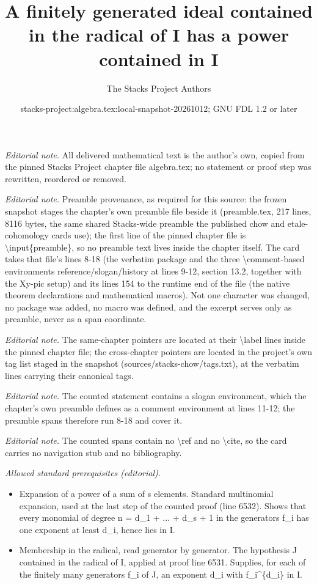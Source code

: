 \documentclass[10pt,a4paper]{amsart}
\title{A finitely generated ideal contained in the radical of I has a power contained in I}
\author{The Stacks Project Authors}
\date{stacks-project:algebra.tex:local-snapshot-20261012; GNU FDL 1.2 or later}
\theoremstyle{plain}
\theoremstyle{definition}
\theoremstyle{remark}
\numberwithin{equation}{subsection}
\begin{document}
\maketitle
\noindent\textit{Editorial note.} All delivered mathematical text is the author's own, copied from the pinned Stacks Project chapter file algebra.tex; no statement or proof step was rewritten, reordered or removed.\par\medskip
\noindent\textit{Editorial note.} Preamble provenance, as required for this source: the frozen snapshot stages the chapter's own preamble file beside it (preamble.tex, 217 lines, 8116 bytes, the same shared Stacks-wide preamble the published chow and etale-cohomology cards use); the first line of the pinned chapter file is \textbackslash{}input\{preamble\}, so no preamble text lives inside the chapter itself. The card takes that file's lines 8-18 (the verbatim package and the three \textbackslash{}comment-based environments reference/slogan/history at lines 9-12, section 13.2, together with the Xy-pic setup) and its lines 154 to the runtime end of the file (the native theorem declarations and mathematical macros). Not one character was changed, no package was added, no macro was defined, and the excerpt serves only as preamble, never as a span coordinate.\par\medskip
\noindent\textit{Editorial note.} The same-chapter pointers are located at their \textbackslash{}label lines inside the pinned chapter file; the cross-chapter pointers are located in the project's own tag list staged in the snapshot (sources/stacks-chow/tags.txt), at the verbatim lines carrying their canonical tags.\par\medskip
\noindent\textit{Editorial note.} The counted statement contains a slogan environment, which the chapter's own preamble defines as a comment environment at lines 11-12; the preamble spans therefore run 8-18 and cover it.\par\medskip
\noindent\textit{Editorial note.} The counted spans contain no \textbackslash{}ref and no \textbackslash{}cite, so the card carries no navigation stub and no bibliography.\par\medskip
\noindent\textit{Allowed standard prerequisites (editorial).}\begin{itemize}
\item Expansion of a power of a sum of s elements. Standard multinomial expansion, used at the last step of the counted proof (line 6532). Shows that every monomial of degree n = d\_1 + ... + d\_s + 1 in the generators f\_i has one exponent at least d\_i, hence lies in I.
\item Membership in the radical, read generator by generator. The hypothesis J contained in the radical of I, applied at proof line 6531. Supplies, for each of the finitely many generators f\_i of J, an exponent d\_i with f\_i\textasciicircum{}\{d\_i\} in I.
\end{itemize}\medskip
\end{document}

